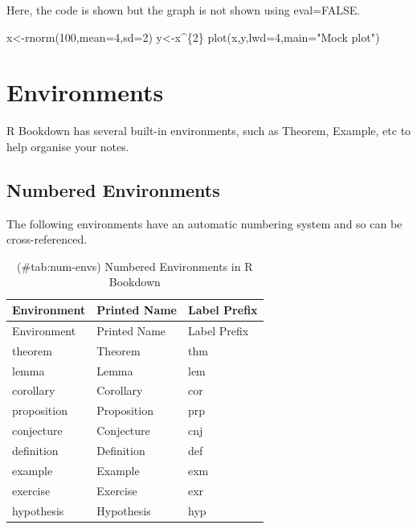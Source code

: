 \documentclass[
  letterpaper,
  oneside]{book}
\newenvironment{Shaded}{\begin{snugshade}}{\end{snugshade}}
\newcommand{\AttributeTok}[1]{\textcolor[rgb]{0.40,0.45,0.13}{#1}}
\newcommand{\DecValTok}[1]{\textcolor[rgb]{0.68,0.00,0.00}{#1}}
\newcommand{\FunctionTok}[1]{\textcolor[rgb]{0.28,0.35,0.67}{#1}}
\newcommand{\NormalTok}[1]{\textcolor[rgb]{0.00,0.23,0.31}{#1}}
\newcommand{\OtherTok}[1]{\textcolor[rgb]{0.00,0.23,0.31}{#1}}
\newcommand{\SpecialCharTok}[1]{\textcolor[rgb]{0.37,0.37,0.37}{#1}}
\newcommand{\StringTok}[1]{\textcolor[rgb]{0.13,0.47,0.30}{#1}}
\numberwithin{equation}{section}
\numberwithin{figure}{section}
\theoremstyle{break}
\theoremstyle{plain}
\theoremstyle{remark}
\begin{document}
Here, the code is shown but the graph is not shown using eval=FALSE.

\begin{Shaded}
\begin{Highlighting}[]
\NormalTok{x}\OtherTok{\textless{}{-}}\FunctionTok{rnorm}\NormalTok{(}\DecValTok{100}\NormalTok{,}\AttributeTok{mean=}\DecValTok{4}\NormalTok{,}\AttributeTok{sd=}\DecValTok{2}\NormalTok{)}
\NormalTok{y}\OtherTok{\textless{}{-}}\NormalTok{x}\SpecialCharTok{\^{}}\NormalTok{\{}\DecValTok{2}\NormalTok{\}}
\FunctionTok{plot}\NormalTok{(x,y,}\AttributeTok{lwd=}\DecValTok{4}\NormalTok{,}\AttributeTok{main=}\StringTok{"Mock plot"}\NormalTok{)}
\end{Highlighting}
\end{Shaded}

\section{Environments}\label{environments}

R Bookdown has several built-in environments, such as Theorem, Example,
etc to help organise your notes.

\subsection{Numbered Environments}\label{numbered-environments}

The following environments have an automatic numbering system and so can
be cross-referenced.

\begin{longtable}[]{@{}lll@{}}
\caption{(\#tab:num-envs) Numbered Environments in R
Bookdown}\tabularnewline
\toprule\noalign{}
Environment & Printed Name & Label Prefix \\
\midrule\noalign{}
\endfirsthead
\toprule\noalign{}
Environment & Printed Name & Label Prefix \\
\midrule\noalign{}
\endhead
\bottomrule\noalign{}
\endlastfoot
theorem & Theorem & thm \\
lemma & Lemma & lem \\
corollary & Corollary & cor \\
proposition & Proposition & prp \\
conjecture & Conjecture & cnj \\
definition & Definition & def \\
example & Example & exm \\
exercise & Exercise & exr \\
hypothesis & Hypothesis & hyp \\
\end{longtable}
\end{document}
